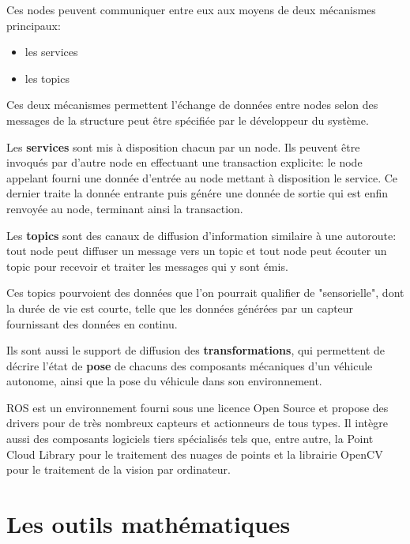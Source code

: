 \documentclass[12pt,a4paper]{report}
\begin{document}
	\para Ces nodes peuvent communiquer entre eux aux moyens de deux mécanismes principaux: \begin{itemize}
		\item les services
		\item les topics
	\end{itemize}

	\para Ces deux mécanismes permettent l'échange de données entre nodes selon des messages de la structure peut être spécifiée par le développeur du système.
	
	\para Les \textbf{services} sont mis à disposition chacun par un node. Ils peuvent être invoqués par d'autre node en effectuant une transaction explicite: le node appelant fourni une donnée d'entrée au node mettant à disposition le service. Ce dernier traite la donnée entrante puis génére une donnée de sortie qui est enfin renvoyée au node, terminant ainsi la transaction.
	
	\para Les \textbf{topics} sont des canaux de diffusion d'information similaire à une autoroute: tout node peut diffuser un message vers un topic et tout node peut écouter un topic pour recevoir et traiter les messages qui y sont émis.
	
	
	\para Ces topics pourvoient des données que l'on pourrait qualifier de "sensorielle", dont la durée de vie est courte, telle que les données générées par un capteur fournissant des données en continu. 
	
	\para Ils sont aussi le support de diffusion des \textbf{transformations}, qui permettent de décrire l'état de \textbf{pose} de chacuns des composants mécaniques d'un véhicule autonome, ainsi que la pose du véhicule dans son environnement.
	
	\para ROS est un environnement fourni sous une licence Open Source et propose des drivers pour de très nombreux capteurs et actionneurs de tous types. Il intègre aussi des composants logiciels tiers spécialisés tels que, entre autre, la Point Cloud Library pour le traitement des nuages de points et la librairie OpenCV pour le traitement de la vision par ordinateur.
	
		
	\section{Les outils mathématiques}
	
\end{document}
